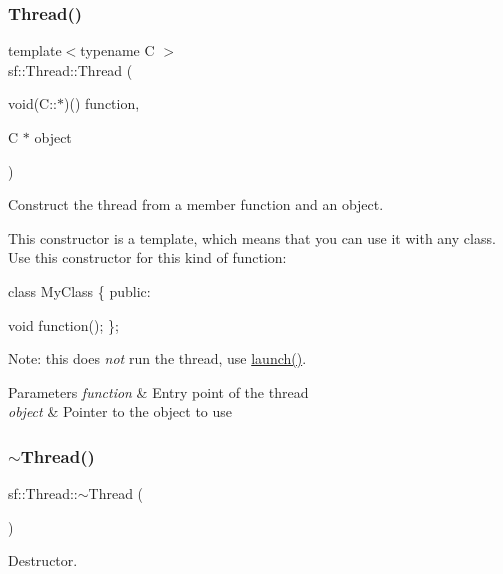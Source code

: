 \subsubsection{\texorpdfstring{Thread()}{Thread()}\hspace{0.1cm}{\footnotesize\ttfamily [3/3]}}
{\footnotesize\ttfamily template$<$typename C $>$ \\
sf\+::\+Thread\+::\+Thread (\begin{DoxyParamCaption}\item[{void(C\+::$\ast$)()}]{function,  }\item[{C $\ast$}]{object }\end{DoxyParamCaption})}



Construct the thread from a member function and an object. 

This constructor is a template, which means that you can use it with any class. Use this constructor for this kind of function\+: 
\begin{DoxyCode}
\textcolor{keyword}{class }MyClass
\{
\textcolor{keyword}{public}:

    \textcolor{keywordtype}{void} \textcolor{keyword}{function}();
\};
\end{DoxyCode}
 Note\+: this does {\itshape not} run the thread, use \hyperlink{classsf_1_1_thread_a74f75a9e86e1eb47479496314048b5f6}{launch()}.


\begin{DoxyParams}{Parameters}
{\em function} & Entry point of the thread \\
\hline
{\em object} & Pointer to the object to use \\
\hline
\end{DoxyParams}
\mbox{\label{classsf_1_1_thread_af77942fc1730af7c31bc4c3a913a9c1d}} 
\subsubsection{\texorpdfstring{$\sim$\+Thread()}{~Thread()}}
{\footnotesize\ttfamily sf\+::\+Thread\+::$\sim$\+Thread (\begin{DoxyParamCaption}{ }\end{DoxyParamCaption})}



Destructor. 

